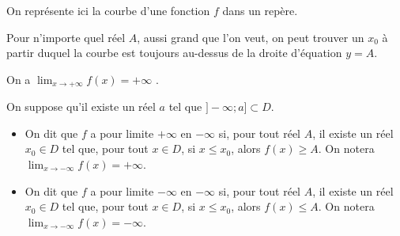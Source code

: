 \documentclass[11pt,fleqn, openany]{book} %
\begin{document}
\begin{example}  On représente ici la courbe d'une fonction $f$ dans un repère.

\begin{minipage}{0.55\linewidth}

 
Pour n'importe quel  réel $A$, aussi grand que l'on veut, on peut trouver un $x_0$ à partir duquel la courbe est toujours au-dessus de la droite d'équation $y=A$. 

On a  $\displaystyle \lim_{x \to +\infty} f(x)=+\infty$ .
\end{minipage}\hfill\begin{minipage}{0.35\linewidth}
\begin{center}
\end{center}
\end{minipage}\end{example}





\begin{definition}On suppose qu'il existe un réel $a$ tel que $]-\infty ; a ] \subset D$.
\begin{itemize}
\item On dit que $f$ a pour limite $+\infty$ en $-\infty$ si, pour tout réel $A$, il existe un réel $x_0 \in D$ tel que, pour tout $x \in D$, si $x  \leqslant x_0$, alors $f(x) \geqslant A$. On notera $\displaystyle \lim_{x \to -\infty} f(x)=+\infty$.
\item On dit que $f$ a pour limite $-\infty$ en $-\infty$ si, pour tout réel $A$, il existe un réel $x_0 \in D$ tel que, pour tout $x \in D$, si $x  \leqslant x_0$, alors $f(x) \leqslant A$. On notera $\displaystyle \lim_{x \to -\infty} f(x)=-\infty$.\end{itemize}\end{definition}
\end{document}
